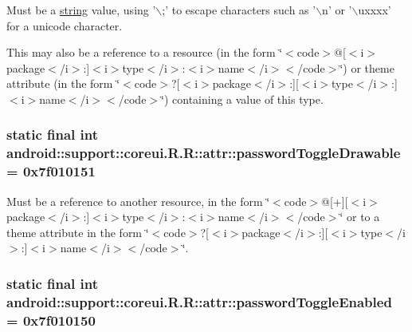 Must be a \hyperlink{classandroid_1_1support_1_1coreui_1_1_r_1_1string}{string} value, using '$\backslash$;' to escape characters such as '$\backslash$n' or '$\backslash$uxxxx' for a unicode character. 

This may also be a reference to a resource (in the form \char`\"{}$<$code$>$@\mbox{[}$<$i$>$package$<$/i$>$:\mbox{]}$<$i$>$type$<$/i$>$:$<$i$>$name$<$/i$>$$<$/code$>$\char`\"{}) or theme attribute (in the form \char`\"{}$<$code$>$?\mbox{[}$<$i$>$package$<$/i$>$:\mbox{]}\mbox{[}$<$i$>$type$<$/i$>$:\mbox{]}$<$i$>$name$<$/i$>$$<$/code$>$\char`\"{}) containing a value of this type. \hypertarget{classandroid_1_1support_1_1coreui_1_1_r_1_1attr_9721d52c001365f59944986b99f076ba}{
\subsubsection[{passwordToggleDrawable}]{\setlength{\rightskip}{0pt plus 5cm}static final int android::support::coreui.R.R::attr::passwordToggleDrawable = 0x7f010151}}
\label{classandroid_1_1support_1_1coreui_1_1_r_1_1attr_9721d52c001365f59944986b99f076ba}


Must be a reference to another resource, in the form \char`\"{}$<$code$>$@\mbox{[}+\mbox{]}\mbox{[}$<$i$>$package$<$/i$>$:\mbox{]}$<$i$>$type$<$/i$>$:$<$i$>$name$<$/i$>$$<$/code$>$\char`\"{} or to a theme attribute in the form \char`\"{}$<$code$>$?\mbox{[}$<$i$>$package$<$/i$>$:\mbox{]}\mbox{[}$<$i$>$type$<$/i$>$:\mbox{]}$<$i$>$name$<$/i$>$$<$/code$>$\char`\"{}. \hypertarget{classandroid_1_1support_1_1coreui_1_1_r_1_1attr_fbe997fc2eba30152ef456b6710eeed5}{
\subsubsection[{passwordToggleEnabled}]{\setlength{\rightskip}{0pt plus 5cm}static final int android::support::coreui.R.R::attr::passwordToggleEnabled = 0x7f010150}}
\label{classandroid_1_1support_1_1coreui_1_1_r_1_1attr_fbe997fc2eba30152ef456b6710eeed5}


